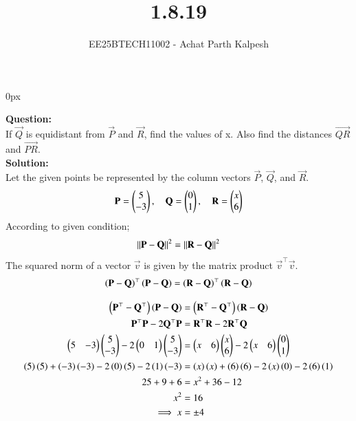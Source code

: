\documentclass[journal]{IEEEtran}
\begin{document}

\title{1.8.19}
\author{EE25BTECH11002 - Achat Parth Kalpesh }
{\let\newpage\relax\maketitle}
\renewcommand{\thefigure}{\theenumi}
\renewcommand{\thetable}{\theenumi}
\setlength{\intextsep}{10pt} %
\renewcommand{\thetable}{\theenumi}
\parindent 0px


\textbf{Question:}\\
If $\vec{Q}$ is equidistant from $\vec{P}$ and $\vec{R}$, find the values of x. Also find the distances $\vec{QR}$ and $\vec{PR}$.\\

\textbf{Solution:}\\
Let the given points be represented by the column vectors $\vec{P}$, $\vec{Q}$, and $\vec{R}$.
\begin{align}
    \mathbf{P} = \begin{pmatrix}5 \\ -3\end{pmatrix}, \quad \mathbf{Q} = \begin{pmatrix}0 \\ 1\end{pmatrix}, \quad \mathbf{R} = \begin{pmatrix}x \\ 6\end{pmatrix}
\end{align}
According to given condition;
\begin{align}
\left\lVert\mathbf{P} - \mathbf{Q}\right\rVert^2 = \left\lVert\mathbf{R} - \mathbf{Q}\right\rVert^2
\end{align}
The squared norm of a vector $\vec{v}$ is given by the matrix product $\vec{v}^\top\vec{v}$.
\begin{align}
\left(\mathbf{P} - \mathbf{Q}\right)^\top \left(\mathbf{P} - \mathbf{Q}\right) = \left(\mathbf{R} - \mathbf{Q}\right)^\top \left(\mathbf{R} - \mathbf{Q}\right) \label{eq:0.3}
\end{align}

\begin{align}
\left(\mathbf{P}^{\top} - \mathbf{Q}^{\top}\right) \left(\mathbf{P} - \mathbf{Q}\right) &= \left(\mathbf{R}^{\top} - \mathbf{Q}^{\top}\right) \left(\mathbf{R} - \mathbf{Q}\right)\\
\mathbf{P}^{\top}\mathbf{P} - 2\mathbf{Q}^{\top}\mathbf{P} &= \mathbf{R}^{\top} \mathbf{R} - 2\mathbf{R}^{\top}\mathbf{Q}\\
\begin{pmatrix}5 & -3\end{pmatrix}\begin{pmatrix}5 \\ -3\end{pmatrix} - 2\begin{pmatrix}0 & 1\end{pmatrix}\begin{pmatrix}5 \\ -3\end{pmatrix} &= \begin{pmatrix}x & 6\end{pmatrix}\begin{pmatrix}x \\ 6\end{pmatrix} - 2\begin{pmatrix}x & 6\end{pmatrix}\begin{pmatrix}0 \\ 1\end{pmatrix}\\
\left(5\right)\left(5\right) + \left(-3\right)\left(-3\right) - 2\left(0\right)\left(5\right) -2\left(1\right)\left(-3\right) &= \left(x\right)\left(x\right) + \left(6\right)\left(6\right) -2\left(x\right)\left(0\right) - 2\left(6\right)\left(1\right) \\
25 + 9 + 6 &= x^2 + 36 -12 \\
x^2 &= 16 \\
    \implies x &= \pm 4
\end{align}
\end{document}
